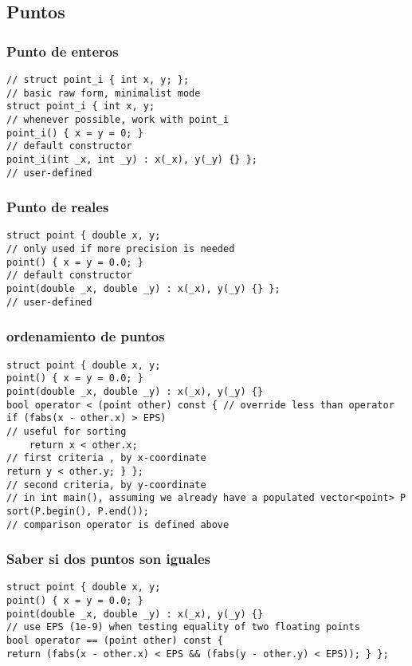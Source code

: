\subsection{Puntos}
\subsubsection{Punto de enteros}
\begin{lstlisting}[style=C]
// struct point_i { int x, y; };
// basic raw form, minimalist mode
struct point_i { int x, y;
// whenever possible, work with point_i
point_i() { x = y = 0; }
// default constructor
point_i(int _x, int _y) : x(_x), y(_y) {} };
// user-defined
\end{lstlisting}
\subsubsection{Punto de reales}
\begin{lstlisting}[style=C]
struct point { double x, y;
// only used if more precision is needed
point() { x = y = 0.0; }
// default constructor
point(double _x, double _y) : x(_x), y(_y) {} };
// user-defined
\end{lstlisting}
\subsubsection{ordenamiento de puntos}
\begin{lstlisting}[style=C]
struct point { double x, y;
point() { x = y = 0.0; }
point(double _x, double _y) : x(_x), y(_y) {}
bool operator < (point other) const { // override less than operator
if (fabs(x - other.x) > EPS)
// useful for sorting
	return x < other.x;
// first criteria , by x-coordinate
return y < other.y; } };
// second criteria, by y-coordinate
// in int main(), assuming we already have a populated vector<point> P
sort(P.begin(), P.end());
// comparison operator is defined above
\end{lstlisting}
\subsubsection{Saber si dos puntos son iguales}
\begin{lstlisting}[style=C]
struct point { double x, y;
point() { x = y = 0.0; }
point(double _x, double _y) : x(_x), y(_y) {}
// use EPS (1e-9) when testing equality of two floating points
bool operator == (point other) const {
return (fabs(x - other.x) < EPS && (fabs(y - other.y) < EPS)); } };
\end{lstlisting}
